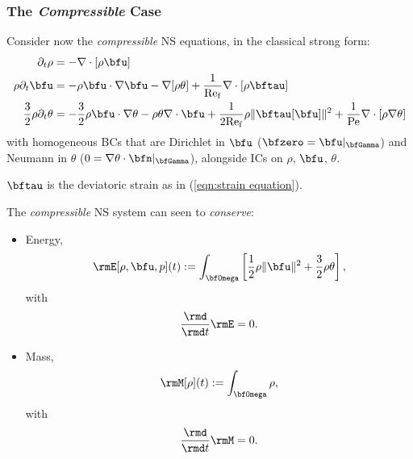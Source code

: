\subsubsection*{The \emph{Compressible} Case}
    Consider now the \emph{compressible} NS equations, in the classical strong form:
    \begin{align}
                           \partial_{t}\rho  &=  - \nabla\cdot[\rho\bfu]  \label{eqn:compressible NS mass equation}  \\
                       \rho\partial_{t}\bfu  &=  - \rho\bfu\cdot\nabla\bfu - \nabla[\rho\theta] + \frac{1}{\rmRef}\nabla\cdot[\rho\bftau]  \label{eqn:compressible NS momentum equation}  \\
        \frac{3}{2}\rho\partial_{t}\theta  &=  - \frac{3}{2}\rho\bfu\cdot\nabla\theta - \rho\theta\nabla\cdot\bfu + \frac{1}{2\rmRef}\rho\|\bftau[\bfu]\|^{2} + \frac{1}{\rmPe}\nabla\cdot[\rho\nabla\theta]  \label{eqn:compressible NS energy equation}
    \end{align}
    with homogeneous BCs that are Dirichlet in $\bfu$ ($\bfzero  =  \bfu|_{\bfGamma}$) and Neumann in $\theta$ ($0  =  \nabla\theta\cdot\bfn|_{\bfGamma}$), alongside ICs on $\rho$, $\bfu$, $\theta$.
    
    $\bftau$ is the deviatoric strain as in (\ref{eqn:strain equation}).

    \shortline

    The \emph{compressible} NS system can seen to \emph{conserve}:
    \begin{itemize}
        \item  Energy,
        \begin{equation}\label{eqn:compressible NS energy definition}
            \rmE[\rho, \bfu, p](t)  :=  \int_{\bfOmega}\left[\frac{1}{2}\rho\|\bfu\|^{2} + \frac{3}{2}\rho\theta\right],
        \end{equation}
        with
        \begin{equation}
            \frac{\rmd}{\rmd t}\rmE  =  0.
        \end{equation}
        \item  Mass,
        \begin{equation}\label{eqn:compressible NS mass definition}
            \rmM[\rho](t)  :=  \int_{\bfOmega}\rho,
        \end{equation}
        with
        \begin{equation}
            \frac{\rmd}{\rmd t}\rmM  =  0.
        \end{equation}
    \end{itemize}

